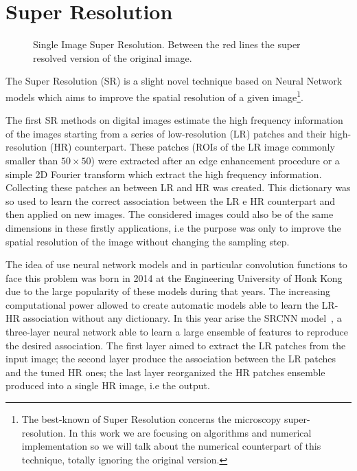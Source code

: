 \documentclass{standalone}
\begin{document}
\section[Super Resolution]{Super Resolution}\label{SR:sr}

\begin{figure}[htbp]
\def\svgwidth{0.5\textwidth}

\quad
\def\svgwidth{0.465\textwidth}

\caption{Single Image Super Resolution.
Between the red lines the super resolved version of the original image.
}
\label{fig:sr_wow}
\end{figure}

The Super Resolution (SR) is a slight novel technique based on Neural Network models which aims to improve the spatial resolution of a given image\footnote{
  The best-known  of Super Resolution concerns the microscopy super-resolution.
  In this work we are focusing on algorithms and numerical implementation so we will talk about the numerical counterpart of this technique, totally ignoring the original  version.
}.

The first SR methods on digital images estimate the high frequency information of the images starting from a series of low-resolution (LR) patches and their high-resolution (HR) counterpart.
These patches (ROIs of the LR image commonly smaller than $50\times50$) were extracted after an edge enhancement procedure or a simple 2D Fourier transform which extract the high frequency information.
Collecting these patches an  between LR and HR was created.
This dictionary was so used to learn the correct association between the LR e HR counterpart and then applied on new images.
The considered images could also be of the same dimensions in these firstly applications, i.e the purpose was only to improve the spatial resolution of the image without changing the sampling step.

The idea of use neural network models and in particular convolution functions to face this problem was born in 2014 at the Engineering University of Honk Kong due to the large popularity of these models during that years.
The increasing computational power allowed to create automatic models able to learn the LR-HR association without any dictionary.
In this year arise the SRCNN model~\cite{SRCNN}, a three-layer neural network able to learn a large ensemble of features to reproduce the desired association.
The first layer aimed to extract the LR patches from the input image; the second layer produce the association between the LR patches and the tuned HR ones; the last layer reorganized the HR patches ensemble produced into a single HR image, i.e the output.
\end{document}
